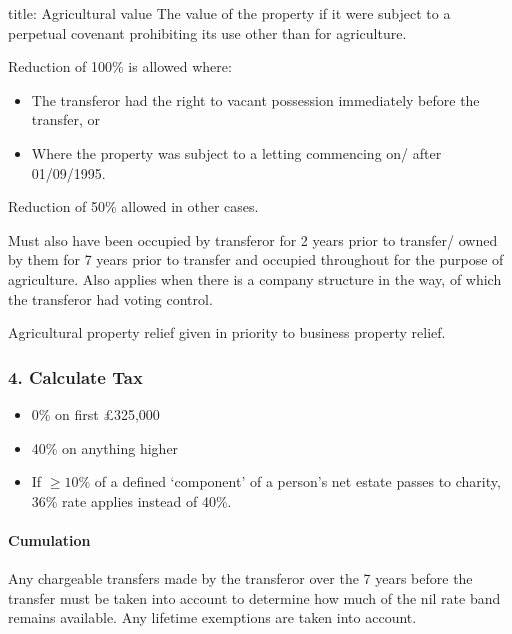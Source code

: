 \documentclass[
]{article}
\newenvironment{Shaded}{}{}
\newcommand{\NormalTok}[1]{#1}
\providecommand{\tightlist}{%
  \setlength{\itemsep}{0pt}\setlength{\parskip}{0pt}}
\begin{document}
\begin{Shaded}
\begin{Highlighting}[]
\NormalTok{title: Agricultural value}
\NormalTok{The value of the property if it were subject to a perpetual covenant prohibiting its use other than for agriculture. }
\end{Highlighting}
\end{Shaded}

Reduction of 100\% is allowed where:

\begin{itemize}
\tightlist
\item
  The transferor had the right to vacant possession immediately before
  the transfer, or
\item
  Where the property was subject to a letting commencing on/ after
  01/09/1995.
\end{itemize}

Reduction of 50\% allowed in other cases.

Must also have been occupied by transferor for 2 years prior to
transfer/ owned by them for 7 years prior to transfer and occupied
throughout for the purpose of agriculture. Also applies when there is a
company structure in the way, of which the transferor had voting
control.

Agricultural property relief given in priority to business property
relief.

\hypertarget{calculate-tax}{%
\subsubsection{4. Calculate Tax}\label{calculate-tax}}

\begin{itemize}
\tightlist
\item
  0\% on first £325,000
\item
  40\% on anything higher
\item
  If \(\geq 10\%\) of a defined `component' of a person's net estate
  passes to charity, 36\% rate applies instead of 40\%.
\end{itemize}

\hypertarget{cumulation}{%
\paragraph{Cumulation}\label{cumulation}}

Any chargeable transfers made by the transferor over the 7 years before
the transfer must be taken into account to determine how much of the nil
rate band remains available. Any lifetime exemptions are taken into
account.
\end{document}
